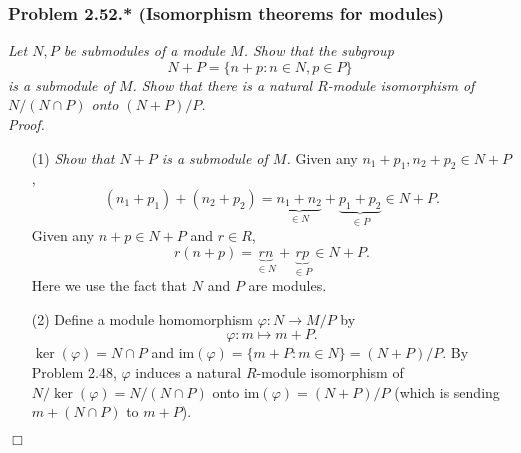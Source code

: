 \documentclass{article}
\begin{document}



\subsubsection*{Problem 2.52.* (Isomorphism theorems for modules)}
\emph{Let $N, P$ be submodules of a module $M$.
Show that the subgroup
\[
  N + P = \{ n + p : n \in N, p \in P \}
\]
is a submodule of $M$.
Show that there is a natural $R$-module isomorphism of $N/(N \cap P)$ onto $(N+P)/P$.} \\



\emph{Proof.}
\begin{enumerate}
\item[(1)]
  \emph{Show that $N+P$ is a submodule of $M$.}
  Given any $n_1+p_1, n_2+p_2 \in N+P$,
  \[
    (n_1+p_1) + (n_2+p_2)
    = \underbrace{n_1+n_2}_{\in N} + \underbrace{p_1+p_2}_{\in P} \in N+P.
  \]
  Given any $n+p \in N+P$ and $r \in R$,
  \[
    r(n+p) = \underbrace{rn}_{\in N} + \underbrace{rp}_{\in P} \in N+P.
  \]
  Here we use the fact that $N$ and $P$ are modules.

\item[(2)]
  Define a module homomorphism $\varphi: N \to M/P$ by
  \[
    \varphi: m \mapsto m + P.
  \]
  $\ker(\varphi) = N \cap P$ and
  $\mathrm{im}(\varphi) = \{ m + P : m \in N \} = (N+P)/P$.
  By Problem 2.48,
  $\varphi$ induces a natural $R$-module isomorphism of
  $N/\ker(\varphi) = N/(N \cap P)$ onto $\mathrm{im}(\varphi) = (N+P)/P$
  (which is sending $m + (N \cap P)$ to $m + P$).


\end{enumerate}
$\Box$ \\\\



\end{document}

